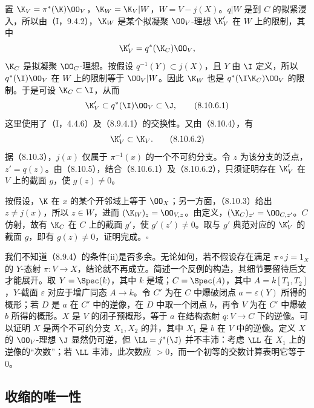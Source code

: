 置 $\K_V=\pi^*(\K)\OO_V$，$\K_W=\K_V|W$，$W=V-j(X)$。$q|W$ 是到 $C$ 的拟紧浸入，所以由（I，9.4.2），$\K_W$ 是某个拟凝聚 $\OO_V$-理想 $\K'_V$ 在 $W$ 上的限制，其中
\[\K'_V=q^*(\K_C)\OO_V,\]
$\K_C$ 是拟凝聚 $\OO_C$-理想。按假设 $q^{-1}(Y)\subset j(X)$，且 $Y$ 由 $\I$ 定义，所以 $q^*(\I)\OO_V$ 在 $W$ 上的限制等于 $\OO_V|W$。因此 $\K_W$ 也是 $q^*(\I\K_C)\OO_V$ 的限制。于是可设 $\K_C\subset\I$，从而
\begin{equation}\K'_V\subset q^*(\I)\OO_V\subset\J,\tag{8.10.6.1}\end{equation}
这里使用了（I，4.4.6）及（8.9.4.1）的交换性。又由（8.10.4），有
\begin{equation}\K'_V\subset\K_V.\tag{8.10.6.2}\end{equation}
据（8.10.3），$j(x)$ 仅属于 $\pi^{-1}(x)$ 的一个不可约分支。令 $z$ 为该分支的泛点，$z'=q(z)$。由（8.10.5），结合（8.10.6.1）及（8.10.6.2），只须证明存在 $\K'_V$ 在 $V$ 上的截面 $g$，使 $g(z)\ne0$。

按假设，$\K$ 在 $x$ 的某个开邻域上等于 $\OO_X$；另一方面，（8.10.3）给出 $z\ne j(x)$，所以 $z\in W$，进而 $(\K_W)_z=\OO_{V,z}$。由定义，$(\K_C)_{z'}=\OO_{C,z'}$。$C$ 仿射，故有 $\K_C$ 在 $C$ 上的截面 $g'$，使 $g'(z')\ne0$。取与 $g'$ 典范对应的 $\K'_V$ 的截面 $g$，即有 $g(z)\ne0$，证明完成。\hfill$\square$

 我们不知道（8.9.4）的条件(ii)是否多余。无论如何，若不假设存在满足 $\pi\circ j=1_X$ 的 $Y$-态射 $\pi:V\to X$，结论就不再成立。简述一个反例的构造，其细节要留待后文才能展开。取 $Y=\Spec(k)$，其中 $k$ 是域；$C=\Spec(A)$，其中 $A=k[T_1,T_2]$，$Y$-截面 $\varepsilon$ 对应于增广同态 $A\to k$。令 $C'$ 为在 $C$ 中爆破闭点 $a=\varepsilon(Y)$ 所得的概形；若 $D$ 是 $a$ 在 $C'$ 中的逆像，在 $D$ 中取一个闭点 $b$，再令 $V$ 为在 $C'$ 中爆破 $b$ 所得的概形。$X$ 是 $V$ 的闭子预概形，等于 $a$ 在结构态射 $q:V\to C$ 下的逆像。可以证明 $X$ 是两个不可约分支 $X_1,X_2$ 的并，其中 $X_1$ 是 $b$ 在 $V$ 中的逆像。定义 $X$ 的 $\OO_V$-理想 $\J$ 显然仍可逆，但 $\LL=j^*(\J)$ 并不丰沛：考虑 $\LL$ 在 $X_1$ 上的逆像的“次数”；若 $\LL$ 丰沛，此次数应 $>0$，而一个初等的交数计算表明它等于 $0$。

\subsection{收缩的唯一性}

